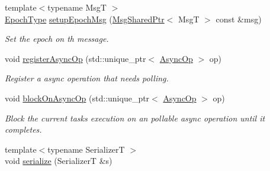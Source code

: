 \begin{DoxyCompactItemize}
{\footnotesize template$<$typename MsgT $>$ }\\\hyperlink{namespacevt_a81d11b28122d43bf9834577e4a06440f}{Epoch\+Type} \hyperlink{structvt_1_1messaging_1_1_active_messenger_ad7402f346c73b2a50ae1feb71140d891}{setup\+Epoch\+Msg} (\hyperlink{structvt_1_1messaging_1_1_msg_shared_ptr}{Msg\+Shared\+Ptr}$<$ MsgT $>$ const \&msg)
\begin{DoxyCompactList}\small\item\em Set the epoch on th message. \end{DoxyCompactList}\item 
void \hyperlink{structvt_1_1messaging_1_1_active_messenger_a3e26d32c550adc1f3589aef49fcfd06e}{register\+Async\+Op} (std\+::unique\+\_\+ptr$<$ \hyperlink{structvt_1_1messaging_1_1_async_op}{Async\+Op} $>$ op)
\begin{DoxyCompactList}\small\item\em Register a async operation that needs polling. \end{DoxyCompactList}\item 
void \hyperlink{structvt_1_1messaging_1_1_active_messenger_add04ad2e4c5d7578410debbb0fa93838}{block\+On\+Async\+Op} (std\+::unique\+\_\+ptr$<$ \hyperlink{structvt_1_1messaging_1_1_async_op}{Async\+Op} $>$ op)
\begin{DoxyCompactList}\small\item\em Block the current task\textquotesingle{}s execution on an pollable async operation until it completes. \end{DoxyCompactList}\item 
{\footnotesize template$<$typename SerializerT $>$ }\\void \hyperlink{structvt_1_1messaging_1_1_active_messenger_aaf97f035a1f144599523144a9abeaf0e}{serialize} (SerializerT \&s)
\end{DoxyCompactItemize}
